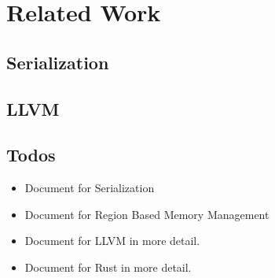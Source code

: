 \chapter{Related Work}
\label{chapter:relatedwork}
\thispagestyle{myheadings}

\graphicspath{{2_RelatedWork/Figures/}}

\label{sec:history}

\clearpage

\section{Serialization}
\label{sec:history}

\clearpage


\section{LLVM}
\label{sec:history}



\section{Todos}
\label{sec:history}
\begin{itemize}
    \item Document for Serialization
    \item Document for Region Based Memory Management
    \item Document for LLVM in more detail.
    \item Document for Rust in more detail.
\end{itemize}




